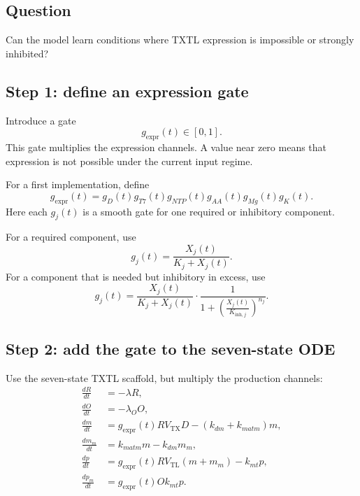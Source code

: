 \documentclass[11pt]{article}
\newcommand{\TX}{\mathrm{TX}}
\newcommand{\TL}{\mathrm{TL}}
\newcommand{\expr}{\mathrm{expr}}
\begin{document}
\subsection{Question}
Can the model learn conditions where TXTL expression is impossible or strongly inhibited?

\subsection{Step 1: define an expression gate}

Introduce a gate
\begin{equation}
    g_{\expr}(t)\in[0,1].
\end{equation}
This gate multiplies the expression channels. A value near zero means that expression is not possible under the current input regime.

For a first implementation, define
\begin{equation}
    g_{\expr}(t)=g_D(t)g_{T7}(t)g_{NTP}(t)g_{AA}(t)g_{Mg}(t)g_K(t).
\end{equation}
Here each $g_j(t)$ is a smooth gate for one required or inhibitory component.

For a required component, use
\begin{equation}
    g_j(t)=\frac{X_j(t)}{K_j+X_j(t)}.
\end{equation}
For a component that is needed but inhibitory in excess, use
\begin{equation}
    g_j(t)=
    \frac{X_j(t)}{K_j+X_j(t)}
    \cdot
    \frac{1}{1+\left(\frac{X_j(t)}{K_{\mathrm{inh},j}}\right)^{n_j}}.
\end{equation}

\subsection{Step 2: add the gate to the seven-state ODE}

Use the seven-state TXTL scaffold, but multiply the production channels:
\begin{align}
    \frac{dR}{dt} &= -\lambda R, \\
    \frac{dO}{dt} &= -\lambda_O O, \\
    \frac{dm}{dt} &= g_{\expr}(t) R V_{\TX}D-(k_{dm}+k_{matm})m, \\
    \frac{dm_m}{dt} &= k_{matm}m-k_{dm}m_m, \\
    \frac{dp}{dt} &= g_{\expr}(t) R V_{\TL}(m+m_m)-k_{mt}p, \\
    \frac{dp_m}{dt} &= g_{\expr}(t) O k_{mt}p.
\end{align}
\end{document}
